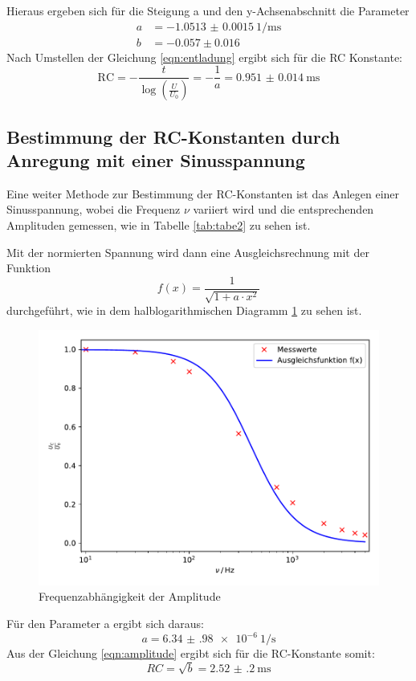 Hieraus ergeben sich für die Steigung a und den y-Achsenabschnitt die Parameter
\begin{align*}
  a&= \SI{-1.0513(15)}{1\per\milli\second} \\
  b&= -0.057 \pm 0.016
\end{align*}
Nach Umstellen der Gleichung \ref{eqn:entladung} ergibt sich für die RC Konstante:
\begin{equation}
  \text{RC} = -\frac{t}{\log\left({\frac{U}{U_0}}\right)} = -\frac{1}{a} =
  \SI{0.951(14)}{\milli\second}
\end{equation}
\subsection{Bestimmung der RC-Konstanten durch Anregung mit einer Sinusspannung}
Eine weiter Methode zur Bestimmung der RC-Konstanten ist das Anlegen einer
Sinusspannung, wobei die Frequenz $ \nu $ variiert wird und die entsprechenden
Amplituden gemessen, wie in Tabelle \ref{tab:tabe2} zu sehen ist.

Mit der normierten Spannung wird dann eine Ausgleichsrechnung mit der Funktion
\begin{equation}
  f(x)= \frac{1}{\sqrt{1+a\cdot x^2}}
\end{equation}
durchgeführt, wie in dem halblogarithmischen Diagramm \ref{fig:Ampl} zu sehen ist.
\begin{figure}[H]
  \centering
  \includegraphics{plot2.pdf}
  \caption{Frequenzabhängigkeit der Amplitude}
  \label{fig:Ampl}
\end{figure}
Für den Parameter a ergibt sich daraus:
\begin{equation*}
  a= \SI{6.34(98)e-6}{1\per\second}
\end{equation*}
Aus der Gleichung \ref{eqn:amplitude} ergibt sich für die RC-Konstante
somit:
\begin{equation}
  RC = \sqrt{b} =\SI{2.52(20)}{\milli\second}
\end{equation}
